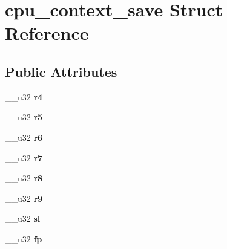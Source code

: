 \hypertarget{structcpu__context__save}{}\section{cpu\+\_\+context\+\_\+save Struct Reference}
\label{structcpu__context__save}
\subsection*{Public Attributes}
\begin{DoxyCompactItemize}
\item 
\hypertarget{structcpu__context__save_ac7545801c2a6ee10afe81c0690975c17}{}\+\_\+\+\_\+u32 {\bfseries r4}\label{structcpu__context__save_ac7545801c2a6ee10afe81c0690975c17}

\item 
\hypertarget{structcpu__context__save_acb2aea7d865c5094ba0f0efb43fb5804}{}\+\_\+\+\_\+u32 {\bfseries r5}\label{structcpu__context__save_acb2aea7d865c5094ba0f0efb43fb5804}

\item 
\hypertarget{structcpu__context__save_a45a8fa5df914cbacd196b8a93eecd65f}{}\+\_\+\+\_\+u32 {\bfseries r6}\label{structcpu__context__save_a45a8fa5df914cbacd196b8a93eecd65f}

\item 
\hypertarget{structcpu__context__save_aee5d70c57cf965cdb0587264d869ff1b}{}\+\_\+\+\_\+u32 {\bfseries r7}\label{structcpu__context__save_aee5d70c57cf965cdb0587264d869ff1b}

\item 
\hypertarget{structcpu__context__save_a482bc12c5e4061af3dcecbc1a9bc1657}{}\+\_\+\+\_\+u32 {\bfseries r8}\label{structcpu__context__save_a482bc12c5e4061af3dcecbc1a9bc1657}

\item 
\hypertarget{structcpu__context__save_a22f4e1b338386c0072dc8d5377854050}{}\+\_\+\+\_\+u32 {\bfseries r9}\label{structcpu__context__save_a22f4e1b338386c0072dc8d5377854050}

\item 
\hypertarget{structcpu__context__save_acacb9cf5cd5144266d50ffa051ba66f0}{}\+\_\+\+\_\+u32 {\bfseries sl}\label{structcpu__context__save_acacb9cf5cd5144266d50ffa051ba66f0}

\item 
\hypertarget{structcpu__context__save_af7a46914752e2b3f9151935c7e772390}{}\+\_\+\+\_\+u32 {\bfseries fp}\label{structcpu__context__save_af7a46914752e2b3f9151935c7e772390}


\end{DoxyCompactItemize}
